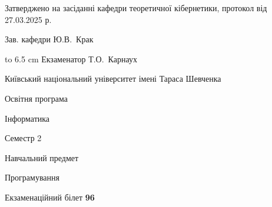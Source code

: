 \documentclass[12pt, ukrainian]{article}
\begin{document}
{\smallskip\smallskip \begin {scriptsize} Затверджено на засіданні кафедри теоретичної кібернетики, протокол   від   27.03.2025 р.\par\smallskip\smallskip\smallskip\smallskip
{\parbox {6.5 cm} {Зав. кафедри \dotfill Ю.В.~Крак}}\hspace {0.7cm} {\hbox to 6.5 cm { Екзаменатор \dotfill Т.О.~Карнаух}} \end{scriptsize}}
\newpage
{{\begin {scriptsize}\par
{ \center  Київський національний університет імені Тараса Шевченка \par}
{\parbox {5 cm}{Освітня програма \hfill}{\parbox {7 cm}{Інформатика\hfill}}\parbox {6 cm}{\hfill Семестр 2}}\par
{\parbox {5 cm} {Навчальний предмет \hfill}\parbox {7 cm}{Програмування \hfill}\parbox {6cm}{\hfill}\par}\vspace{-15pt} \end{scriptsize}}{\center Екзаменаційний білет \No \textbf { 96 }\par}}
\end{document}
